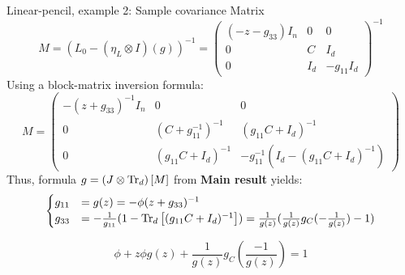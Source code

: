 \documentclass[10pt]{beamer}
\begin{document}
\begin{frame}{Linear-pencil, example 2: Sample covariance Matrix}
  \begin{equation*}
    M= (L_0 - (\eta_L \otimes I)(g))^{-1} = 
    \begin{pmatrix}
      (-z - g_{33}) I_n & 0 & 0\\
      0 & C  & I_d\\
      0 & I_d & -g_{11} I_d
    \end{pmatrix}^{-1}
  \end{equation*}
  Using a block-matrix inversion formula:
  \begin{equation*}
    M = 
    \begin{pmatrix}
      -(z + g_{33})^{-1} I_n & 0 & 0\\
      0 & (C+g_{11}^{-1})^{-1} & (g_{11} C + I_d)^{-1}\\
      0 & (g_{11} C + I_d)^{-1} & -g_{11}^{-1} (I_d - (g_{11} C+ I_d)^{-1})
   \end{pmatrix}
  \end{equation*}
  Thus, formula $g = \traceLimOp[d]{M}$ from \textbf{Main result} yields:
  \begin{equation*}
    \begin{cases}
      g_{11} & = g(z) = - \phi (z+ g_{33})^{-1}\\
      g_{33} & = - \frac{1}{g_{11}} (1 - \traceLim[d]{ (g_{11} C + I_d)^{-1}})
      = \frac{1}{g(z)} ( \frac{1}{g(z)} 
      g_C(-\frac{1}{g(z)}) - 1)
    \end{cases}
  \end{equation*}
  \begin{block}{}
      $$
        \phi + z \phi g(z) + \frac{1}{g(z)} 
        g_C \left(\frac{-1}{g(z)}\right) = 1 
      $$
  \end{block}
\end{frame}


\end{document}
